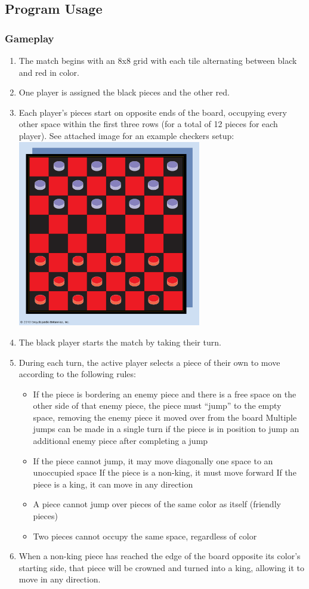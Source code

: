 \documentclass[10pt]{article}
\begin{document}
\subsection{Program Usage}
\subsubsection{Gameplay}
\begin{enumerate}[label*=G\arabic*.]
	\item The match begins with an 8x8 grid with each tile alternating between black and red in color.
	\item One player is assigned the black pieces and the other red.
	\item Each player’s pieces start on opposite ends of the board, occupying every other space within the first three rows (for a total of 12 pieces for each player).
	\subitem See attached image for an example checkers setup:
	\subitem \includegraphics[width=8cm]{board.png}
	\item The black player starts the match by taking their turn.
	\item During each turn, the active player selects a piece of their own to move according to the following rules:
\begin{itemize}
    \item If the piece is bordering an enemy piece and there is a free space on the other side of that enemy piece, the piece must “jump” to the empty space, removing the enemy piece it moved over from the board
        \subitem Multiple jumps can be made in a single turn if the piece is in position to jump an additional enemy piece after completing a jump
    \item If the piece cannot jump, it may move diagonally one space to an unoccupied space
        \subitem If the piece is a non-king, it must move forward
        \subitem If the piece is a king, it can move in any direction
    \item A piece cannot jump over pieces of the same color as itself (friendly pieces)
    \item Two pieces cannot occupy the same space, regardless of color
\end{itemize}

\item When a non-king piece has reached the edge of the board opposite its color’s starting side, that piece will be crowned and turned into a king, allowing it to move in any direction.
\end{enumerate}
\end{document}
